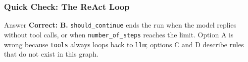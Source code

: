 \begin{frame}[fragile]\frametitle{Quick Check: The ReAct Loop}
\begin{block}{Answer}
\textbf{Correct: B.} \texttt{should\_continue} ends the run when the model replies without tool calls, or when \texttt{number\_of\_steps} reaches the limit. Option A is wrong because \texttt{tools} always loops back to \texttt{llm}; options C and D describe rules that do not exist in this graph.
\end{block}
\end{frame}
